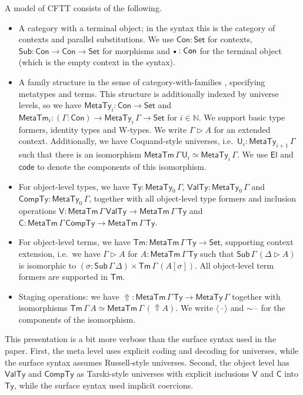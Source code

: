 \documentclass[acmsmall,screen]{acmart}
\newcommand{\msf}[1]{{\mathsf{#1}}}
\newcommand{\mbb}[1]{\mathbb{#1}}
\newcommand{\U}{\mathsf{U}}
\newcommand{\code}{\mathsf{code}}
\newcommand{\bs}[1]{\boldsymbol{#1}}
\newcommand{\emptycon}{\scaleobj{.75}\bullet}
\newcommand{\El}{\msf{El}}
\newcommand{\Set}{\msf{Set}}
\newcommand{\Con}{\msf{Con}}
\newcommand{\Sub}{\msf{Sub}}
\newcommand{\Tm}{\msf{Tm}}
\newcommand{\ext}{\triangleright}
\newcommand{\Lift}{{\Uparrow}}
\newcommand{\spl}{{\bs{\sim}}}
\newcommand{\ql}{{\bs{\langle}}}
\newcommand{\qr}{{\bs{\rangle}}}
\newcommand{\MTy}{\msf{MetaTy}}
\newcommand{\MTm}{\msf{MetaTm}}
\newcommand{\VTy}{\msf{ValTy}}
\newcommand{\Ty}{\msf{Ty}}
\newcommand{\CTy}{\msf{CompTy}}
\newcommand{\blank}{{\mathord{\hspace{1pt}\text{--}\hspace{1pt}}}}
\theoremstyle{remark}
\begin{document}
\begin{definition}[] A model of CFTT consists of the following.

\begin{itemize}
\item A category with a terminal object; in the syntax this is the category
  of contexts and parallel substitutions. We use $\Con : \Set$ for contexts,
  $\Sub : \Con \to \Con \to \Set$ for morphisms and $\emptycon : \Con$ for the
  terminal object (which is the empty context in the syntax).
\item A family structure in the sense of category-with-families \cite{Dybjer96internaltype},
  specifying metatypes and terms. This structure is additionally indexed by
  universe levels, so we have $\MTy_i : \Con \to \Set$ and $\msf{MetaTm}_i :
  (\Gamma : \Con) \to \MTy_i\,\Gamma \to \Set$ for $i \in \mbb{N}$. We support
  basic type formers, identity types and W-types. We write $\Gamma \ext A$ for
  an extended context. Additionally, we have Coquand-style universes,
  i.e.\ $\U_i : \MTy_{i+1}\,\Gamma$ such that there is an isomorphism
  $\msf{MetaTm}\,\Gamma\,\U_i \simeq \MTy_i\,\Gamma$.  We use $\El$ and
  $\code$ to denote the components of this isomorphism.
\item
  For object-level types, we have $\Ty : \MTy_0\,\Gamma$, $\VTy :
  \MTy_0\,\Gamma$ and $\CTy : \MTy_0\,\Gamma$, together with all object-level
  type formers and inclusion operations $\msf{V} : \MTm\,\Gamma\,\VTy \to \MTm\,\Gamma\,\Ty$
  and $\msf{C} : \MTm\,\Gamma\,\CTy \to \MTm\,\Gamma\,\Ty$.
\item For object-level terms, we have $\Tm : \MTm\,\Gamma\,\Ty \to \Set$,
  supporting context extension, i.e.\ we have $\Gamma\ext A$ for
  $A : \MTm\,\Gamma\,\Ty$ such that $\Sub\,\Gamma\,(\Delta\ext A)$ is isomorphic
  to $(\sigma : \Sub\,\Gamma\,\Delta) \times \Tm\,\Gamma\,(A[\sigma])$. All
  object-level term formers are supported in $\Tm$.
\item Staging operations: we have $\Lift : \MTm\,\Gamma\,\Ty \to \MTy\,\Gamma$ together
  with isomorphisms $\Tm\,\Gamma\,A \simeq \MTm\,\Gamma\,(\Lift A)$.
  We write $\ql\!\blank\!\qr$ and $\spl\!\blank$ for the components of the isomorphism.
\end{itemize}
\end{definition}
This presentation is a bit more verbose than the surface syntax used in the
paper. First, the meta level uses explicit coding and decoding for universes,
while the surface syntax assumes Russell-style universes. Second, the object
level has $\VTy$ and $\CTy$ as Tarski-style universes with explicit inclusions
$\msf{V}$ and $\msf{C}$ into $\Ty$, while the surface syntax used implicit
coercions.
\end{document}
